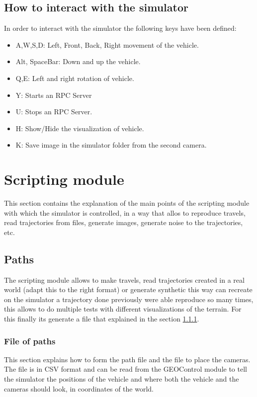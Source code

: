 \documentclass[10pt,a4paper,twocolumn,twoside]{article}
\begin{document}
\subsection{How to interact with the simulator}
In order to interact with the simulator the following keys have been defined:

\begin{itemize}
\item A,W,S,D: Left, Front, Back, Right movement of the vehicle.
\item Alt, SpaceBar: Down and up the vehicle.
\item Q,E: Left and right rotation of vehicle.
\item Y: Starts an RPC Server
\item U: Stops an RPC Server.
\item H: Show/Hide the visualization of vehicle.
\item K: Save image in the simulator folder from the second camera.
\end{itemize}

\section{Scripting module}
\label{modulescript}

This section contains the explanation of the main points of the scripting module with which the simulator is controlled, in a way that allos to reproduce travels, read trajectories from files, generate images, generate noise to the trajectories, etc.

\subsection{Paths}
The scripting module allows to make travels, read trajectories created in a real world (adapt this to the right format) or generate synthetic this way can recreate on the simulator a trajectory done previously were able reproduce so many times, this allows to do multiple tests with different visualizations of the terrain. For this finally its generate a file that explained in the section \ref{file-trajectories}.

\subsubsection{File of paths}
\label{file-trajectories}
This section explains how to form the path file and the file to place the cameras. The file is in CSV format and can be read from the GEOControl module to tell the simulator the positions of the vehicle and where both the vehicle and the cameras should look, in coordinates of the world.
\end{document}
